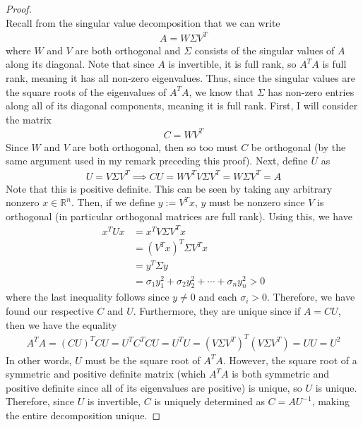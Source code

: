 \documentclass[10pt,a4paper]{article}
\theoremstyle{definition}
\theoremstyle{definition}
\numberwithin{equation}{section}
\begin{document}
\begin{proof}$ $
\\Recall from the singular value decomposition that we can write 
\begin{align*}
A = W\Sigma V^T
\end{align*}
where $W$ and $V$ are both orthogonal and $\Sigma$ consists of the singular values of $A$ along its diagonal. Note that since $A$ is invertible, it is full rank, so $A^TA$ is full rank, meaning it has all non-zero eigenvalues. Thus, since the singular values are the square roots of the eigenvalues of $A^TA$, we know that $\Sigma$ has non-zero entries along all of its diagonal components, meaning it is full rank. First, I will consider the matrix 
\begin{align*}
C = WV^T
\end{align*}
Since $W$ and $V$ are both orthogonal, then so too must $C$ be orthogonal (by the same argument used in my remark preceding this proof). Next, define $U$ as 
\begin{align*}
U = V \Sigma V^T \implies CU = WV^T V \Sigma V^T = W \Sigma V^T = A
\end{align*}
Note that this is positive definite. This can be seen by taking any arbitrary nonzero $x \in \mathbb{R}^n$. Then, if we define $y := V^T x$, $y$ must be nonzero since $V$ is orthogonal (in particular orthogonal matrices are full rank). Using this, we have
\begin{align*}
x^T U x &= x^T V \Sigma V^T x\\
&= (V^T x)^T \Sigma V^T x\\
&= y^T \Sigma y\\
&= \sigma_1 y_1^2 + \sigma_2 y_2^2 + \cdots + \sigma_n y_n^2 > 0
\end{align*}
where the last inequality follows since $y \neq 0$ and each $\sigma_i > 0$. Therefore, we have found our respective $C$ and $U$. Furthermore, they are unique since if $A = CU$, then we have the equality
\begin{align*}
A^T A = (CU)^T CU = U^T C^T C U = U^T U = (V \Sigma V^T)^T (V \Sigma V^T) = U U = U^2
\end{align*}
In other words, $U$ must be the square root of $A^TA$. However, the square root of a symmetric and positive definite matrix (which $A^TA$ is both symmetric and positive definite since all of its eigenvalues are positive) is unique, so $U$ is unique. Therefore, since $U$ is invertible, $C$ is uniquely determined as $C = AU^{-1}$, making the entire decomposition unique. 
\end{proof}
\end{document}
